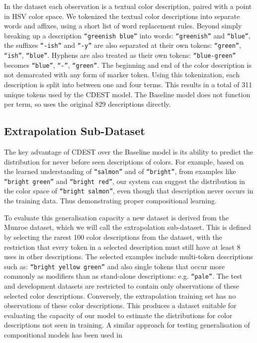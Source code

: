 \documentclass[11pt,letterpaper, twocolumn]{article}
\newcommand{\textcite}{\cite}
\begin{document}
In the dataset each observation is a textual color description, paired with a point in HSV color space.
We tokenized the textual color descriptions into separate words and affixes, using a short list of word replacement rules.
Beyond simply breaking up a description \texttt{``greenish blue''} into words: \texttt{``greenish''} and \texttt{``blue''}, the suffixes \texttt{``-ish''} and \texttt{``-y''} are also separated at their own tokens: \texttt{``green''}, \texttt{``ish''}, \texttt{``blue''}.
Hyphens are also treated as their own tokens: \texttt{``blue-green''} becomes \texttt{``blue''}, \texttt{``-''}, \texttt{``green''}.
The beginning and end of the color description is not demarcated with any form of marker token.
Using this tokenization, each description is split into between one and four terms.
This results in a total of 311 unique tokens used by the CDEST model.
The Baseline model does not function per term, so uses the original 829 descriptions directly.


\subsection{Extrapolation Sub-Dataset}
The key advantage of CDEST over the Baseline model is its ability to predict the distribution for never before seen descriptions of colors.
For example, based on the learned understanding of \texttt{``salmon''} and of \texttt{``bright''}, from examples like \texttt{``bright green''} and \texttt{``bright red''}, our system can suggest the distribution in the color space of \texttt{``bright salmon''}, even though that description never occurs in the training data.
Thus demonstrating proper compositional learning.

To evaluate this generalisation capacity a new dataset is derived from the Munroe dataset, which we will call the extrapolation sub-dataset.
This is defined by selecting the rarest 100 color descriptions from the dataset,
with the restriction that every token in a selected description must still have at least 8 uses in other descriptions.
The selected examples include multi-token descriptions such as: \texttt{``bright yellow green''} and also single tokens that occur more commonly as modifiers than as stand-alone descriptions: e.g. \texttt{``pale''}.
The test and development datasets are restricted to contain only observations of these selected color descriptions.
Conversely, the extrapolation training set has no observations of these color descriptions.
This produces a dataset suitable for evaluating the capacity of our model to estimate the distributions for color descriptions not seen in training.
A similar approach for testing generalisation of compositional models has been used in \textcite{DBLP:journals/corr/AtzmonBKGC16}
\end{document}
